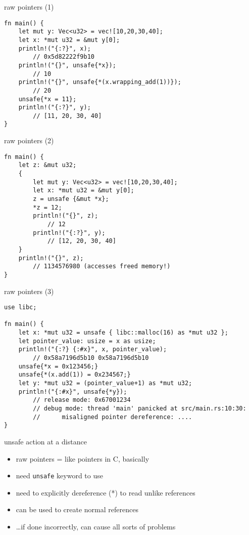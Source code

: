 \begin{frame}[fragile]{raw pointers (1)}
\begin{verbatim}
fn main() {
    let mut y: Vec<u32> = vec![10,20,30,40];
    let x: *mut u32 = &mut y[0];
    println!("{:?}", x);
        // 0x5d82222f9b10
    println!("{}", unsafe{*x});
        // 10
    println!("{}", unsafe{*(x.wrapping_add(1))});
        // 20
    unsafe{*x = 11};
    println!("{:?}", y);
        // [11, 20, 30, 40]
}
\end{verbatim}
\end{frame}

\begin{frame}[fragile]{raw pointers (2)}
\begin{verbatim}
fn main() {
    let z: &mut u32;
    {
        let mut y: Vec<u32> = vec![10,20,30,40];
        let x: *mut u32 = &mut y[0];
        z = unsafe {&mut *x};
        *z = 12;
        println!("{}", z);
            // 12
        println!("{:?}", y);
            // [12, 20, 30, 40]
    }
    println!("{}", z);
        // 1134576980 (accesses freed memory!)
}
\end{verbatim}
\end{frame}

\begin{frame}[fragile]{raw pointers (3)}
\begin{verbatim}
use libc;

fn main() {
    let x: *mut u32 = unsafe { libc::malloc(16) as *mut u32 };
    let pointer_value: usize = x as usize;
    println!("{:?} {:#x}", x, pointer_value);
        // 0x58a7196d5b10 0x58a7196d5b10
    unsafe{*x = 0x123456;}
    unsafe{*(x.add(1)) = 0x234567;}
    let y: *mut u32 = (pointer_value+1) as *mut u32;
    println!("{:#x}", unsafe{*y});
        // release mode: 0x67001234
        // debug mode: thread 'main' panicked at src/main.rs:10:30:
        //      misaligned pointer dereference: ....
}
\end{verbatim}
\end{frame}

\begin{frame}{unsafe action at a distance}
    \begin{itemize}
    \item raw pointers = like pointers in C, basically
    \item need \texttt{unsafe} keyword to use
    \item need to explicitly dereference (*) to read unlike references
    \vspace{.5cm}
    \item can be used to create normal references
    \item \ldots if done incorrectly, can cause all sorts of problems
    \end{itemize}
\end{frame}

